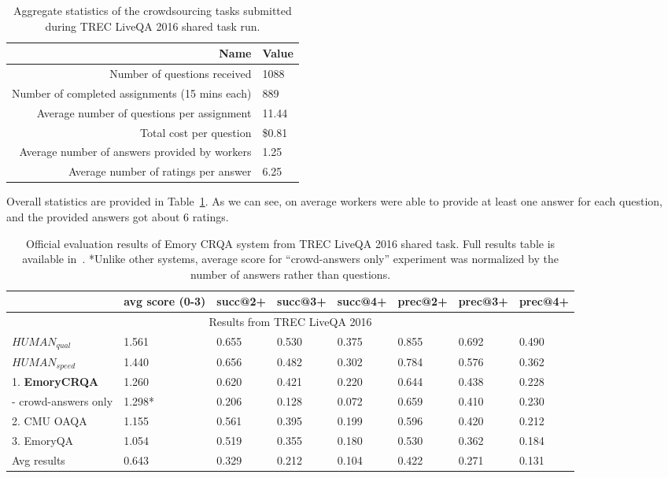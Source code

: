 \begin{table}[h]
\centering
\begin{tabular}{r|l}
Name & Value \\
\hline
Number of questions received & 1088 \\
Number of completed assignments (15 mins each) & 889 \\
Average number of questions per assignment & 11.44 \\
Total cost per question & \$0.81 \\
Average number of answers provided by workers & 1.25 \\
Average number of ratings per answer & 6.25 \\
\end{tabular}
\caption{Aggregate statistics of the crowdsourcing tasks submitted during TREC LiveQA 2016 shared task run.}
\label{table:non-factoid:crowdsourcing:crqa:task_stats}
\end{table}

Overall statistics are provided in Table~\ref{table:non-factoid:crowdsourcing:crqa:task_stats}.
As we can see, on average workers were able to provide at least one answer for each question, and the provided answers got about 6 ratings.

\begin{table}
\centering
\footnotesize
\begin{tabular}[t]
{l|p{0.8cm}p{1cm}p{1cm}p{1cm}p{1cm}p{1cm}p{1cm}}
& avg score (0-3) & succ@2+ & succ@3+ & succ@4+ & prec@2+ &  prec@3+ & prec@4+ \\
\hline
\multicolumn{8}{c}{Results from TREC LiveQA 2016} \\
\hline
$HUMAN_{qual}$ & 1.561 & 0.655 & 0.530 & 0.375 & 0.855 & 0.692 & 0.490\\
$HUMAN_{speed}$ & 1.440 & 0.656 & 0.482 & 0.302 & 0.784 & 0.576 & 0.362\\
\hline
1. \textbf{EmoryCRQA} & 1.260 & 0.620 & 0.421 & 0.220 & 0.644 & 0.438 & 0.228 \\
   - crowd-answers only & 1.298* & 0.206 & 0.128 & 0.072 & 0.659 & 0.410 & 0.230 \\
2. CMU OAQA & 1.155 & 0.561 & 0.395 & 0.199 & 0.596 & 0.420 & 0.212 \\
3. EmoryQA & 1.054 & 0.519 & 0.355 & 0.180 & 0.530 & 0.362 & 0.184 \\
\hline
Avg results & 0.643 & 0.329 & 0.212 & 0.104 & 0.422 & 0.271 & 0.131 \\
\end{tabular}
\caption{Official evaluation results of Emory CRQA system from TREC LiveQA 2016 shared task. Full results table is available in~\cite{overviewliveqa16}. *Unlike other systems, average score for ``crowd-answers only'' experiment was normalized by the number of answers rather than questions.}
\label{table:non-factoid:crowdsoudcing:officialresults}
\end{table}

